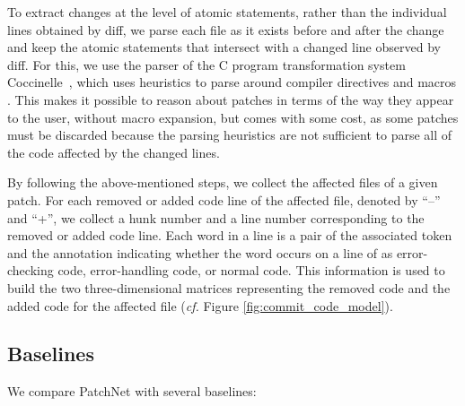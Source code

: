 To extract changes at the level of atomic statements, rather than the
individual lines obtained by diff, we parse each file as it exists before
and after the change and keep the atomic statements that intersect with
a changed line observed by diff.  For this, we use the parser of the C
program transformation system Coccinelle~\cite{padioleau2008documenting},
which uses heuristics to parse around compiler directives and macros
\cite{yoann:cc}.  This makes it possible to reason about patches in terms
of the way they appear to the user, without macro expansion, but comes with
some cost, as some patches must be discarded because the parsing heuristics
are not sufficient to parse all of the code affected by the changed
lines. %

By following the above-mentioned steps, we collect the affected files of a
given patch. For each removed or added code line of the affected file,
denoted by ``--'' and ``+'', we collect a hunk number and a line number
corresponding to the removed or added code line. Each word in a line is a
pair of the associated token and the annotation indicating whether the word
occurs on a line of as error-checking code, error-handling code, or normal
code.  This information is used to build the two three-dimensional matrices
representing the removed code and the added code for the affected file
({\em cf.} Figure \ref{fig:commit_code_model}).

\subsection{Baselines}
\label{sec:baselines}
We compare PatchNet with several baselines:

